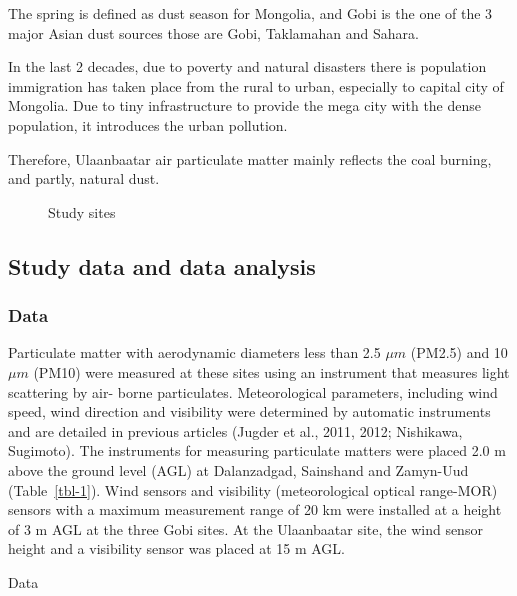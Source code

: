 \documentclass[
  number]{elsarticle}
\begin{document}
The spring is defined as dust season for Mongolia, and Gobi is the one
of the 3 major Asian dust sources those are Gobi, Taklamahan and Sahara.

In the last 2 decades, due to poverty and natural disasters there is
population immigration has taken place from the rural to urban,
especially to capital city of Mongolia. Due to tiny infrastructure to
provide the mega city with the dense population, it introduces the urban
pollution.

Therefore, Ulaanbaatar air particulate matter mainly reflects the coal
burning, and partly, natural dust.

\begin{figure}


\caption{\label{fig-1}Study sites}

\end{figure}%

\subsection{Study data and data
analysis}\label{study-data-and-data-analysis}

\subsubsection{Data}\label{data}

Particulate matter with aerodynamic diameters less than 2.5 \(\mu m\)
(PM2.5) and 10 \(\mu m\) (PM10) were measured at these sites using an
instrument that measures light scattering by air- borne particulates.
Meteorological parameters, including wind speed, wind direction and
visibility were determined by automatic instruments and are detailed in
previous articles (Jugder et al., 2011, 2012; Nishikawa, Sugimoto). The
instruments for measuring particulate matters were placed 2.0 m above
the ground level (AGL) at Dalanzadgad, Sainshand and Zamyn-Uud
(Table~\ref{tbl-1}). Wind sensors and visibility (meteorological optical
range-MOR) sensors with a maximum measurement range of 20 km were
installed at a height of 3 m AGL at the three Gobi sites. At the
Ulaanbaatar site, the wind sensor height and a visibility sensor was
placed at 15 m AGL.

\begin{table}

\caption{\label{tbl-1}Data}


\end{table}%
\end{document}
